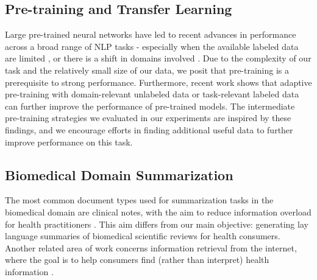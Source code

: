 \documentclass[letterpaper, table]{article} %
\begin{document}
\subsection{Pre-training and Transfer Learning}
Large pre-trained neural networks have led to recent advances in performance across a broad range of NLP tasks \cite{peters2018elmo, Radford2018ImprovingLU,Devlin2019BERTPO} - especially when the available labeled data are limited \cite{brown2020language}, or there is a shift in domains involved \cite{Hendrycks2020PretrainedTI}. Due to the complexity of our task and the relatively small size of our data, we posit that pre-training is a prerequisite to strong performance. Furthermore, recent work shows that adaptive pre-training with domain-relevant unlabeled data \cite{Gururangan2020DontSP} or task-relevant labeled data \cite{Pruksachatkun2020IntermediateTaskTL} can further improve the performance of pre-trained models. The intermediate pre-training strategies we evaluated in our experiments are inspired by these findings, and we encourage efforts in finding additional useful data to further improve performance on this task.
\subsection{Biomedical Domain Summarization}
The most common document types used for summarization tasks in the biomedical domain are clinical notes, with the aim to reduce information overload for health practitioners \cite{pivovarov2015automated, feblowitz2011summarization, molla2011development}. This aim differs from our main objective: generating lay language summaries of biomedical scientific reviews for health consumers. Another related area of work concerns information retrieval from the internet, where the goal is to help consumers find (rather than interpret) health information \cite{goeuriot2020overview}. 


\end{document}
